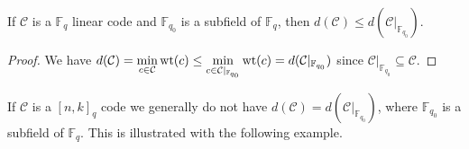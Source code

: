 \begin{proposition}\label{prop:mininum_distance_of_subfield_subcode}
  If $\mathcal{C}$ is a $\mathbb{F}_q$ linear code and $\mathbb{F}_{q_0}$ is a subfield of $\mathbb{F}_q$, then $d(\mathcal{C}) \leq d(\mathcal{C} \vert_{\mathbb{F}_{q_0}})$.
\end{proposition}
\begin{proof}
  We have $\displaystyle d(\mathcal{C}) = \min_{c \in \mathcal{C}} \mathrm{wt}(c) \leq \min_{c \in \mathcal{C} \vert_{\mathbb{F}_{q_0}}} \mathrm{wt}(c) = d(\mathcal{C} \vert_{\mathbb{F}_{q_0}})$ since $\mathcal{C} \vert_{\mathbb{F}_{q_0}} \subseteq \mathcal{C}$.
\end{proof}
If $\mathcal{C}$ is a $[n, k]_q$ code we generally do not have $d(\mathcal{C}) = d(\mathcal{C} \vert_{\mathbb{F}_{q_0}})$, where $\mathbb{F}_{q_0}$ is a subfield of $\mathbb{F}_q$. This is illustrated with the following example.

